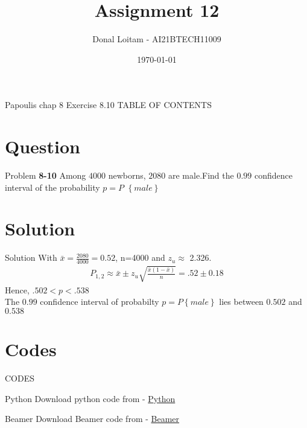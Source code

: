 \documentclass{beamer}
\title{Assignment 12}
\author{Donal Loitam - AI21BTECH11009}
\date{\today}
\providecommand{\cbrak}[1]{\ensuremath{\left\{#1\right\}}}
\begin{document}
\begin{frame}
    \titlepage 
\end{frame}

\logo{}


\begin{frame}{Papoulis chap 8 Exercise 8.10}
TABLE OF CONTENTS
    \tableofcontents
\end{frame}


\section{Question}
\begin{frame}{Problem}
\textbf{8-10} Among $4000$ newborns, $2080$ are male.Find the $0.99$ confidence interval of the probability $p = P$ \cbrak{male} 
\end{frame}

\section{Solution}
\begin{frame}{Solution}
With $\bar{x} = \frac{2080}{4000}=0.52$, n=4000 and $z_u \approx $ 2.326. 
\begin{align}
P_{1,2} \approx \bar{x} \pm z_u \sqrt{\frac{\bar{x}(1-\bar{x})}{n}} = .52 \pm 0.18
\end{align}
Hence, $.502 < p < .538$\\
The $0.99$ confidence interval of probabilty $p = P\cbrak{male}  $ lies between $0.502$ and $0.538$ 
\end{frame}



\section{Codes}
\begin{frame}{CODES}
    \begin{block}{Python}
         Download python code from - \href{...}{Python}
    \end{block}

 \begin{block}{Beamer}
         Download Beamer code from - \href{https://github.com/Donal-08/Assignment12/blob/main/beamer_12.tex}{Beamer}
    \end{block}
\end{frame} 
\end{document}

